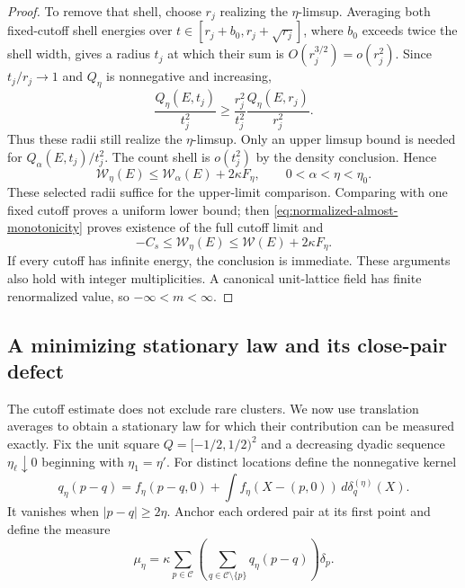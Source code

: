 \begin{proof}
To remove that shell, choose $r_j$ realizing the $\eta$-limsup.
Averaging both fixed-cutoff shell energies over
$t\in[r_j+b_0,r_j+\sqrt{r_j}]$, where $b_0$ exceeds twice the
shell width, gives a radius $t_j$ at which their sum is
$O(r_j^{3/2})=o(r_j^2)$.
Since $t_j/r_j\to1$ and $Q_\eta$ is nonnegative and increasing,
\[
 \frac{Q_\eta(E,t_j)}{t_j^2}
   \ge\frac{r_j^2}{t_j^2}\frac{Q_\eta(E,r_j)}{r_j^2}.
\]
Thus these radii still realize the $\eta$-limsup.  Only an upper
limsup bound is needed for $Q_\alpha(E,t_j)/t_j^2$.
The count shell is $o(t_j^2)$ by the density conclusion.  Hence
\begin{equation}
 \mathcal W_\eta(E)\le\mathcal W_\alpha(E)+2\kappa F_\eta,
 \qquad 0<\alpha<\eta<\eta_0.
 \label{eq:normalized-almost-monotonicity}
\end{equation}
These selected radii suffice for the upper-limit comparison.
Comparing with one fixed cutoff proves a uniform lower bound;
then \eqref{eq:normalized-almost-monotonicity} proves existence of the
full cutoff limit and
\begin{equation}
 -C_s\le\mathcal W_\eta(E)\le\mathcal W(E)+2\kappa F_\eta.
 \label{eq:normalized-cutoff-bound}
\end{equation}
If every cutoff has infinite energy, the conclusion is immediate.
These arguments also hold with integer multiplicities.
A canonical unit-lattice field has finite renormalized value, so
$-\infty<m<\infty$.

\end{proof}

\subsection{A minimizing stationary law and its close-pair defect}

The cutoff estimate does not exclude rare clusters. We now use translation
averages to obtain a stationary law for which their contribution can be
measured exactly. Fix the unit square $Q=[-1/2,1/2)^2$ and a decreasing
dyadic sequence $\eta_\ell\downarrow0$ beginning with $\eta_1=\eta'$.
For distinct locations define the nonnegative kernel
\[
 q_\eta(p-q)=f_\eta(p-q,0)
             +\int f_\eta(X-(p,0))\,d\delta_q^{(\eta)}(X).
\]
It vanishes when $|p-q|\ge2\eta$.
Anchor each ordered pair at its first point and define the measure
\[
 \mu_\eta=\kappa\sum_{p\in\mathcal C}
          \left(\sum_{q\in\mathcal C\setminus\{p\}}q_\eta(p-q)\right)\delta_p.
\]

